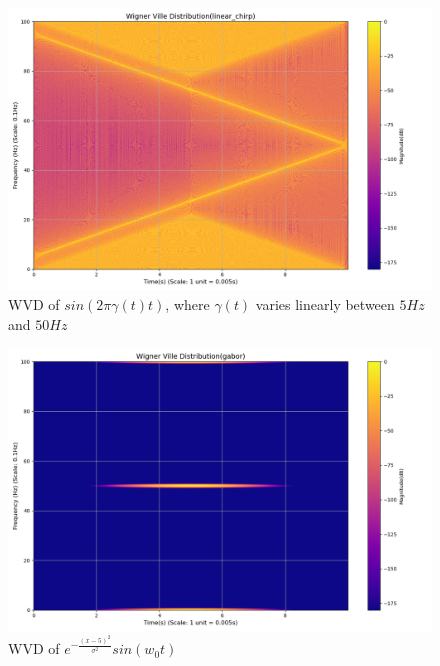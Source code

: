 \documentclass[12pt,a4paper,onecolumn]{exam}
\begin{document}
\begin{solution}
\begin{itemize}
        \begin{figure}[H]
        \centering
        \includegraphics[scale = 0.35]{linear_chirp_wvd.png}
        \caption{WVD of $sin(2\pi\gamma(t)t)$, where $\gamma(t)$ varies linearly between $5Hz$ and $50Hz$}
        \label{fig:27}
        \end{figure}

        \begin{figure}[H]
        \centering
        \includegraphics[scale = 0.35]{gabor_wvd.png}
        \caption{WVD of $e^{-\frac{(x-5)^2}{\sigma^2}}sin(w_0t)$}
        \label{fig:28}
        \end{figure}
  \end{itemize}
\end{solution}
\end{document}
